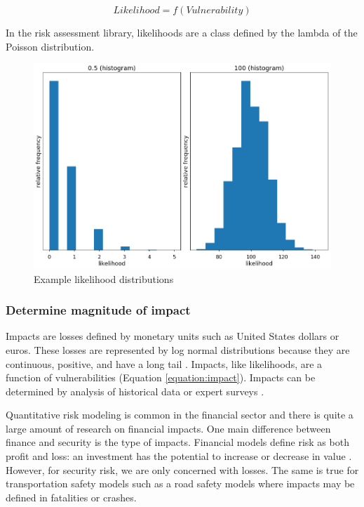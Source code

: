 \documentclass{article}
\begin{document}
\begin{equation}
    Likelihood = f(Vulnerability)
    \label{equation:likelihood}
\end{equation}

In the risk assessment library, likelihoods are a class defined by the lambda of the Poisson distribution.

\begin{figure}[h] \centering
    \includegraphics[width=\textwidth]{images/likelihoods.png}
    \caption{Example likelihood distributions}
    \label{figure:likelihoods}
\end{figure}

\subsubsection{Determine magnitude of impact}

Impacts are losses defined by monetary units such as United States dollars or euros. These losses are represented by log normal distributions because they are continuous, positive, and have a long tail \citep{hubbard_how_2016}. Impacts, like likelihoods, are a function of vulnerabilities (Equation \ref{equation:impact}). Impacts can be determined by analysis of historical data or expert surveys \citep{joh_defining_2017}.

Quantitative risk modeling is common in the financial sector and there is quite a large amount of research on financial impacts. One main difference between finance and security is the type of impacts. Financial models define risk as both profit and loss: an investment has the potential to increase or decrease in value \citep{embrechts_lectures_2005, mcneil_quantitative_2015}. However, for  security risk, we are only concerned with losses. The same is true for transportation safety models such as a road safety models where impacts may be defined in fatalities or crashes.
\end{document}
